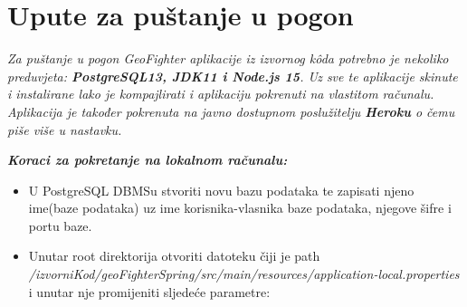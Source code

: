 			\eject
		
		\section{Upute za puštanje u pogon}
		
			\textit{Za puštanje u pogon GeoFighter aplikacije iz izvornog kôda potrebno je nekoliko preduvjeta: \textbf{PostgreSQL13, JDK11 i Node.js 15}. Uz sve te aplikacije skinute i instalirane lako je kompajlirati i aplikaciju pokrenuti na vlastitom računalu. Aplikacija je također pokrenuta na javno dostupnom poslužitelju \textbf{Heroku} o čemu piše više u nastavku.\\}
			
			\textbf{\textit{Koraci za pokretanje na lokalnom računalu:}}
			
			\begin{itemize}
				
				\item U PostgreSQL DBMSu stvoriti novu bazu podataka te zapisati njeno ime(baze podataka) uz ime korisnika-vlasnika baze podataka, njegove šifre i portu baze.
				
				\item Unutar root direktorija otvoriti datoteku čiji je path\\ \textit{/izvorniKod/geoFighterSpring/src/main/resources/application-local.properties}\\ i unutar nje promijeniti sljedeće parametre: 
			

\end{itemize}
